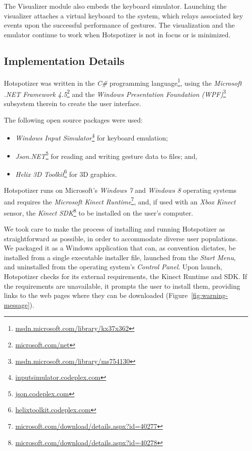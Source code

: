 The Visualizer module also embeds the keyboard simulator. Launching the visualizer attaches a virtual keyboard to the system, which relays associated key events upon the successful performance of gestures. The visualization and the emulator continue to work when Hotspotizer is not in focus or is minimized.

\subsection{Implementation Details}

Hotspotizer was written in the \emph{C\#} programming language\footnote{\href{http://msdn.microsoft.com/en-us/library/kx37x362.aspx}{msdn.microsoft.com/library/kx37x362}}, using the \emph{Microsoft .NET Framework 4.5}\footnote{\href{http://www.microsoft.com/net}{microsoft.com/net}} and the \emph{Windows Presentation Foundation (WPF)}\footnote{\href{http://msdn.microsoft.com/en-us/library/ms754130.aspx}{msdn.microsoft.com/library/ms754130}} subsystem therein to create the user interface.

The following open source packages were used:

\begin{itemize}
\item \emph{Windows Input Simulator}\footnote{\href{http://inputsimulator.codeplex.com/}{inputsimulator.codeplex.com}} for keyboard emulation;
\item \emph{Json.NET}\footnote{\href{http://json.codeplex.com/}{json.codeplex.com}} for reading and writing gesture data to files; and,
\item \emph{Helix 3D Toolkit}\footnote{\href{http://helixtoolkit.codeplex.com/}{helixtoolkit.codeplex.com}} for 3D graphics.
\end{itemize}

Hotspotizer runs on Microsoft's \emph{Windows 7} and \emph{Windows 8} operating systems and requires the \emph{Microsoft Kinect Runtime}\footnote{\href{http://www.microsoft.com/en-us/download/details.aspx?id=40277}{microsoft.com/download/details.aspx?id=40277}}, and, if used with an \emph{Xbox Kinect} sensor, the \emph{Kinect SDK}\footnote{\href{http://www.microsoft.com/en-us/download/details.aspx?id=40278}{microsoft.com/download/details.aspx?id=40278}} to be installed on the user's computer.

We took care to make the process of installing and running Hotspotizer as straightforward as possible, in order to accommodate diverse user populations. We packaged it as a Windows application that can, as convention dictates, be installed from a single executable installer file, launched from the \emph{Start Menu}, and uninstalled from the operating system's \emph{Control Panel}. Upon launch, Hotspotizer checks for its external requirements, the Kinect Runtime and SDK. If the requirements are unavailable, it prompts the user to install them, providing links to the web pages where they can be downloaded (Figure~\ref{fig:warning-message}).

